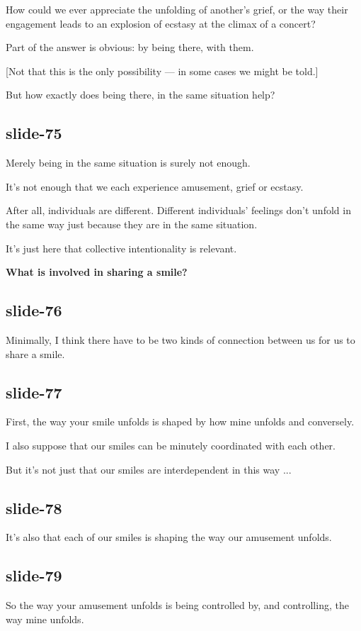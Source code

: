 \documentclass[12pt,\papersize]{extarticle}
\begin{document}
How could we ever appreciate the unfolding of another’s grief, or the way their engagement leads to an explosion of ecstasy at the climax of a concert?

Part of the answer is obvious: by being there, with them.

[Not that this is the only possibility --- in some cases we might  be told.]

But how exactly does being there, in the same situation help?

\subsection{slide-75}
Merely being in the same situation is surely not enough.

It’s not enough that we each experience amusement, grief or ecstasy.

After all, individuals are different.  Different individuals’ feelings don’t unfold in the same way just because they are in the same situation.

It’s just here that collective intentionality is relevant.

\textbf{What is involved in sharing a smile?}

\subsection{slide-76}
Minimally, I think there have to be two kinds of connection between us for us to share a smile.

\subsection{slide-77}
First, the way your smile unfolds is shaped by how mine unfolds and conversely.

I also suppose that our smiles can be minutely coordinated with each other.

But it’s not just that our smiles are interdependent in this way ...

\subsection{slide-78}
It’s also that each of our smiles is shaping the way our amusement unfolds.

\subsection{slide-79}
So the way your amusement unfolds is being controlled by, and controlling, the way mine unfolds.
\end{document}
